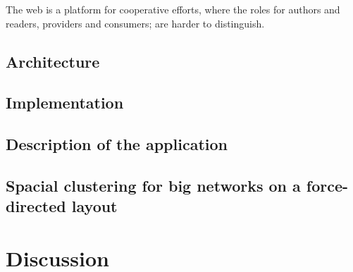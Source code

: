 The web is a platform for cooperative efforts, where the roles for authors and readers, providers and consumers; are harder to distinguish.

\subsection{Architecture}
\subsection{Implementation}
\subsection{Description of the application}

\subsection{Spacial clustering for big networks on a force-directed layout}

\section{Discussion}


